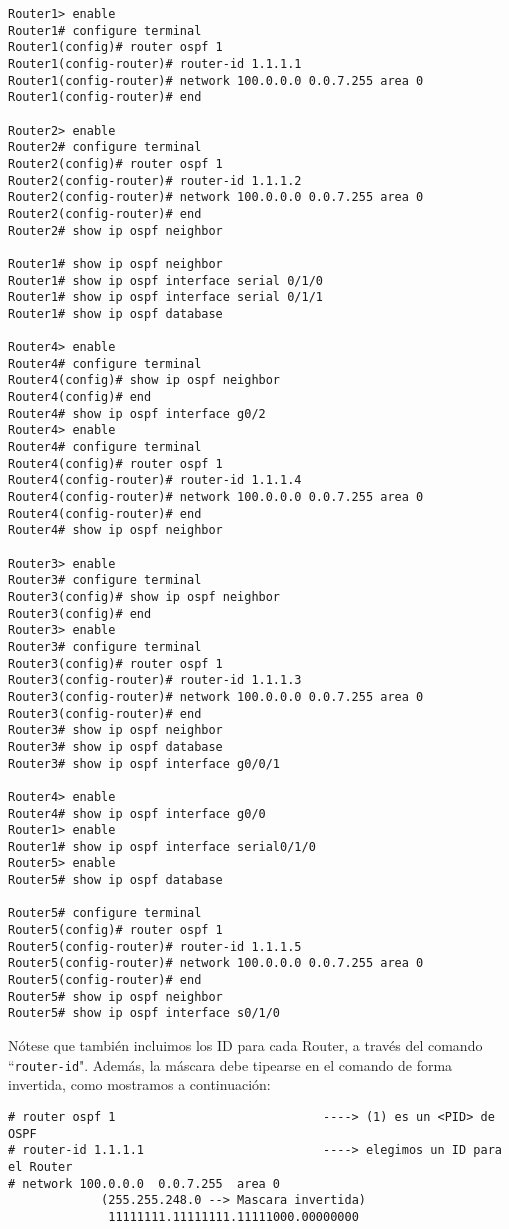 \documentclass{article}
\begin{document}
\begin{verbatim}
Router1> enable
Router1# configure terminal
Router1(config)# router ospf 1
Router1(config-router)# router-id 1.1.1.1
Router1(config-router)# network 100.0.0.0 0.0.7.255 area 0
Router1(config-router)# end

Router2> enable
Router2# configure terminal
Router2(config)# router ospf 1
Router2(config-router)# router-id 1.1.1.2
Router2(config-router)# network 100.0.0.0 0.0.7.255 area 0
Router2(config-router)# end
Router2# show ip ospf neighbor

Router1# show ip ospf neighbor
Router1# show ip ospf interface serial 0/1/0
Router1# show ip ospf interface serial 0/1/1
Router1# show ip ospf database

Router4> enable
Router4# configure terminal
Router4(config)# show ip ospf neighbor
Router4(config)# end
Router4# show ip ospf interface g0/2
Router4> enable
Router4# configure terminal
Router4(config)# router ospf 1
Router4(config-router)# router-id 1.1.1.4
Router4(config-router)# network 100.0.0.0 0.0.7.255 area 0
Router4(config-router)# end
Router4# show ip ospf neighbor

Router3> enable
Router3# configure terminal
Router3(config)# show ip ospf neighbor
Router3(config)# end
Router3> enable
Router3# configure terminal
Router3(config)# router ospf 1
Router3(config-router)# router-id 1.1.1.3
Router3(config-router)# network 100.0.0.0 0.0.7.255 area 0
Router3(config-router)# end
Router3# show ip ospf neighbor
Router3# show ip ospf database
Router3# show ip ospf interface g0/0/1

Router4> enable
Router4# show ip ospf interface g0/0
Router1> enable
Router1# show ip ospf interface serial0/1/0
Router5> enable
Router5# show ip ospf database

Router5# configure terminal
Router5(config)# router ospf 1
Router5(config-router)# router-id 1.1.1.5
Router5(config-router)# network 100.0.0.0 0.0.7.255 area 0
Router5(config-router)# end
Router5# show ip ospf neighbor
Router5# show ip ospf interface s0/1/0

\end{verbatim}

N\'otese que tambi\'en incluimos los ID para cada Router, a trav\'es del comando ``\texttt{router-id}". Adem\'as, la m\'ascara debe tipearse en el comando de forma invertida, como mostramos a continuaci\'on:

\begin{verbatim}
# router ospf 1                             ----> (1) es un <PID> de OSPF
# router-id 1.1.1.1                         ----> elegimos un ID para el Router
# network 100.0.0.0  0.0.7.255  area 0
		     (255.255.248.0 --> Mascara invertida)
		      11111111.11111111.11111000.00000000

\end{verbatim}
\end{document}
